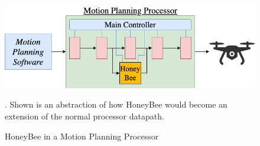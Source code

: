 \begin{figure}[H]
\begin{centering}
\includegraphics[width=0.8\linewidth]{chapters/chapter3/img/honeybee_in_processor.png}
\caption{HoneyBee in a Motion Planning Processor}{. Shown is an abstraction of how HoneyBee would become an extension of the normal processor datapath.}
\label{fig:honeybee_in_processor}
\end{centering}
\end{figure}